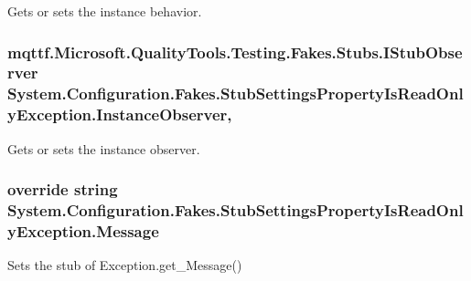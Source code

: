 Gets or sets the instance behavior.

\hypertarget{class_system_1_1_configuration_1_1_fakes_1_1_stub_settings_property_is_read_only_exception_ae24b02f9e3e30155fc4250c42bab0afe}{
\subsubsection[{Instance\-Observer}]{\setlength{\rightskip}{0pt plus 5cm}mqttf.\-Microsoft.\-Quality\-Tools.\-Testing.\-Fakes.\-Stubs.\-I\-Stub\-Observer System.\-Configuration.\-Fakes.\-Stub\-Settings\-Property\-Is\-Read\-Only\-Exception.\-Instance\-Observer\hspace{0.3cm}{\ttfamily [get]}, {\ttfamily [set]}}}\label{class_system_1_1_configuration_1_1_fakes_1_1_stub_settings_property_is_read_only_exception_ae24b02f9e3e30155fc4250c42bab0afe}


Gets or sets the instance observer.

\hypertarget{class_system_1_1_configuration_1_1_fakes_1_1_stub_settings_property_is_read_only_exception_a15e9037716a5f3c0329100a9ea4e6faf}{
\subsubsection[{Message}]{\setlength{\rightskip}{0pt plus 5cm}override string System.\-Configuration.\-Fakes.\-Stub\-Settings\-Property\-Is\-Read\-Only\-Exception.\-Message\hspace{0.3cm}{\ttfamily [get]}}}\label{class_system_1_1_configuration_1_1_fakes_1_1_stub_settings_property_is_read_only_exception_a15e9037716a5f3c0329100a9ea4e6faf}


Sets the stub of Exception.\-get\-\_\-\-Message()


